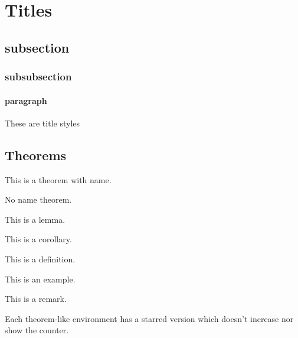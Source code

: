 \documentclass[lineno=off]{wunschnote}
\begin{document}
    \maketitle

    \section{Titles}
    \subsection{subsection}
    \subsubsection{subsubsection}
    \paragraph{paragraph} These are title styles

    \subsection{Theorems}

    \begin{theorem}
        This is a theorem with name.
    \end{theorem}

    \begin{theorem}
        No name theorem.
    \end{theorem}

    \begin{lemma}
        This is a lemma.
    \end{lemma}

    \begin{corollary}
        This is a corollary.
    \end{corollary}

    \begin{definition}
        This is a definition.
    \end{definition}

    \begin{example}
        This is an example.
    \end{example}

    \begin{remark}
        This is a remark.
    \end{remark}

    \begin{remark*}
        Each theorem-like environment has a starred version which doesn't increase nor show the counter.
    \end{remark*}
\end{document}
